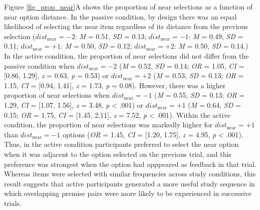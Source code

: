 \documentclass[floatsintext,man]{apa6}
\theoremstyle{definition}
\theoremstyle{definition}
\theoremstyle{definition}
\theoremstyle{remark}
\begin{document}
Figure \ref{fig_prop_near}A shows the proportion of near selections as a
function of near option distance. In the passive condition, by design
there was an equal likelihood of selecting the near item regardless of
its distance from the previous selection (\(dist_{\text{near}}=-2\):
\emph{M} = 0.51, \emph{SD} = 0.13; \(dist_{\text{near}}=-1\): \emph{M} =
0.49, \emph{SD} = 0.11; \(dist_{\text{near}}=+1\): \emph{M} = 0.50,
\emph{SD} = 0.12; \(dist_{\text{near}}=+2\): \emph{M} = 0.50, \emph{SD}
= 0.14.) In the active condition, the proportion of near selections did
not differ from the passive condition when \(dist_{\text{near}}=-2\)
(\emph{M} = 0.52, \emph{SD} = 0.14; \emph{OR} = 1.05, \emph{CI} =
{[}0.86, 1.29{]}, \emph{z} = 0.63, \emph{p} = 0.53) or
\(dist_{\text{near}}=+2\) (\emph{M} = 0.53, \emph{SD} = 0.13; \emph{OR}
= 1.15, \emph{CI} = {[}0.94, 1.41{]}, \emph{z} = 1.73, \emph{p} = 0.08).
However, there was a higher proportion of near selections when
\(dist_{\text{near}}=-1\) (\emph{M} = 0.55, \emph{SD} = 0.13; \emph{OR}
= 1.29, \emph{CI} = {[}1.07, 1.56{]}, \emph{z} = 3.48, \emph{p}
\textless{} .001) or \(dist_{\text{near}}=+1\) (\emph{M} = 0.64,
\emph{SD} = 0.15; \emph{OR} = 1.75, \emph{CI} = {[}1.45, 2.11{]},
\emph{z} = 7.52, \emph{p} \textless{} .001). Within the active
condition, the proportion of near selections was markedly higher for
\(dist_{\text{near}}=+1\) than \(dist_{\text{near}}=-1\) options
(\emph{OR} = 1.45, \emph{CI} = {[}1.20, 1.75{]}, \emph{z} = 4.95,
\emph{p} \textless{} .001). Thus, in the active condition participants
preferred to select the near option when it was adjacent to the option
selected on the previous trial, and this preference was strongest when
the option had apppeared as feedback in that trial. Whereas items were
selected with similar frequencies across study conditions, this result
suggests that active participants generated a more useful study sequence
in which overlapping premise pairs were more likely to be experienced in
successive trials.
\end{document}
